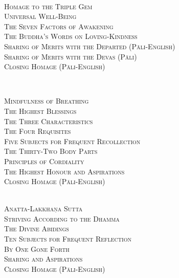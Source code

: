 {  {\libertinusFont\selectfont\textbf{\textsc{}}}\\

  \textsc{
    Homage to the Triple Gem \pageref{dedication-of-offerings}\\
    Universal Well-Being \pageref{universal-well-being}\\
    The Seven Factors of Awakening \pageref{seven-factors-of-awakening}\\
    The Buddha's Words on Loving-Kindness \pageref{words-on-loving-kindness}\\
    Sharing of Merits with the Departed (Pāli-English) \pageref{sharing-merits-departed}\\
    Sharing of Merits with the Devas (Pāli) \pageref{sharing-merits-devas}\\
    Closing Homage (Pāli-English) \pageref{closing-homage}}\\

  \clearpage

  {\libertinusFont\selectfont\textbf{\textsc{}}}\\

  \textsc{
    Mindfulness of Breathing \pageref{mindfulness-of-breathing}\\
    The Highest Blessings \pageref{highest-blessings}\\
    The Three Characteristics \pageref{three-characteristics}\\
    The Four Requisites \pageref{four-requisites}\\
    Five Subjects for Frequent Recollection \pageref{five-recollections}\\
    The Thirty-Two Body Parts \pageref{32-parts}\\
    Principles of Cordiality \pageref{principles-of-cordiality}\\
    The Highest Honour and Aspirations \pageref{highest-honour-aspirations}\\
    Closing Homage (Pāli-English) \pageref{closing-homage}}\\


  {\libertinusFont\selectfont\textbf{\textsc{}}}\\

  \textsc{
    Anatta-Lakkhaṇa Sutta \pageref{anatta-lakkhana}\\
    Striving According to the Dhamma \pageref{striving-according-to-dhamma}\\
    The Divine Abidings \pageref{divine-abidings}\\
    Ten Subjects for Frequent Reflection\\ By One Gone Forth \pageref{ten-recollections}\\
    Sharing and Aspirations \pageref{sharing-aspirations}\\
    Closing Homage (Pāli-English) \pageref{closing-homage}}\\

}
